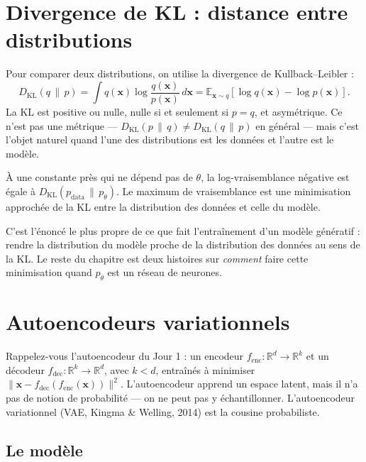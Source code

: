 \section{Divergence de KL : distance entre distributions}

Pour comparer deux distributions, on utilise la divergence de Kullback--Leibler :
\[
D_{\mathrm{KL}}(q \,\|\, p) = \int q(\bm{x}) \log \frac{q(\bm{x})}{p(\bm{x})} \, d\bm{x} = \mathbb{E}_{\bm{x} \sim q}\!\left[ \log q(\bm{x}) - \log p(\bm{x}) \right].
\]
La KL est positive ou nulle, nulle si et seulement si $p = q$, et asymétrique. Ce n'est pas une métrique --- $D_{\mathrm{KL}}(p \,\|\, q) \neq D_{\mathrm{KL}}(q \,\|\, p)$ en général --- mais c'est l'objet naturel quand l'une des distributions est les données et l'autre est le modèle.

\begin{proposition}
À une constante près qui ne dépend pas de $\theta$, la log-vraisemblance négative est égale à $D_{\mathrm{KL}}(p_{\text{data}} \,\|\, p_\theta)$. Le maximum de vraisemblance est une minimisation approchée de la KL entre la distribution des données et celle du modèle.
\end{proposition}

C'est l'énoncé le plus propre de ce que fait l'entraînement d'un modèle génératif : rendre la distribution du modèle proche de la distribution des données au sens de la KL. Le reste du chapitre est deux histoires sur \emph{comment} faire cette minimisation quand $p_\theta$ est un réseau de neurones.

\section{Autoencodeurs variationnels}

Rappelez-vous l'autoencodeur du Jour 1 : un encodeur $f_{\text{enc}}: \mathbb{R}^d \to \mathbb{R}^k$ et un décodeur $f_{\text{dec}}: \mathbb{R}^k \to \mathbb{R}^d$, avec $k < d$, entraînés à minimiser $\|\bm{x} - f_{\text{dec}}(f_{\text{enc}}(\bm{x}))\|^2$. L'autoencodeur apprend un espace latent, mais il n'a pas de notion de probabilité --- on ne peut pas y échantillonner. L'autoencodeur variationnel (VAE, Kingma \& Welling, 2014) est la cousine probabiliste.

\subsection{Le modèle}

